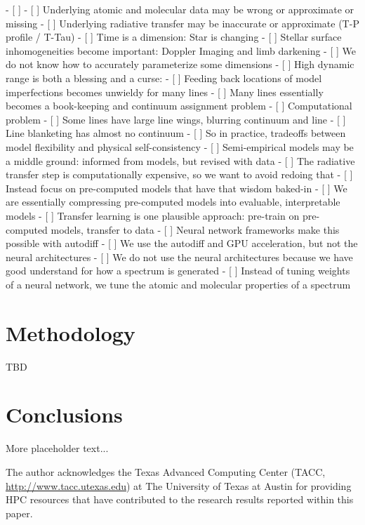 \documentclass[modern]{aastex631}
\begin{document}
- [ ]
- [ ] Underlying atomic and molecular data may be wrong or approximate or missing
- [ ] Underlying radiative transfer may be inaccurate or approximate (T-P profile / T-Tau)
- [ ] Time is a dimension: Star is changing
- [ ] Stellar surface inhomogeneities become important: Doppler Imaging and limb darkening
- [ ] We do not know how to accurately parameterize some dimensions
- [ ] High dynamic range is both a blessing and a curse:
- [ ] Feeding back locations of model imperfections becomes unwieldy for many lines
- [ ] Many lines essentially becomes a book-keeping and continuum assignment problem
- [ ] Computational problem
- [ ] Some lines have large line wings, blurring continuum and line
- [ ] Line blanketing has almost no continuum
- [ ] So in practice, tradeoffs between model flexibility and physical self-consistency
- [ ] Semi-empirical models may be a middle ground: informed from models, but revised with data
- [ ] The radiative transfer step is computationally expensive, so we want to avoid redoing that
- [ ] Instead focus on pre-computed models that have that wisdom baked-in
- [ ] We are essentially compressing pre-computed models into evaluable, interpretable models
- [ ] Transfer learning is one plausible approach: pre-train on pre-computed models, transfer to data
- [ ] Neural network frameworks make this possible with autodiff
- [ ] We use the autodiff and GPU acceleration, but not the neural architectures
- [ ] We do not use the neural architectures because we have good understand for how a spectrum is generated
- [ ] Instead of tuning weights of a neural network, we tune the atomic and molecular properties of a spectrum



\newpage


\section{Methodology}

TBD

\section{Conclusions}

More placeholder text...


\begin{acknowledgements}
  The author acknowledges the Texas Advanced Computing Center (TACC, \url{http://www.tacc.utexas.edu}) at The University of Texas at Austin for providing HPC resources that have contributed to the research results reported within this paper.
\end{acknowledgements}
\end{document}
